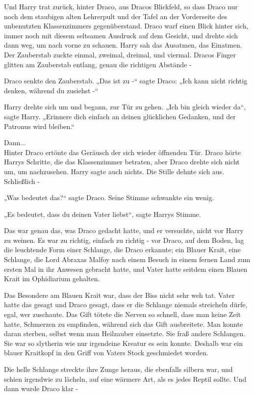 {Und Harry trat zurück, hinter Draco, aus Dracos Blickfeld, so dass Draco nur noch dem staubigen alten Lehrerpult und der Tafel an der Vorderseite des unbenutzten Klassenzimmers gegenüberstand. Draco warf einen Blick hinter sich, immer noch mit diesem seltsamen Ausdruck auf dem Gesicht, und drehte sich dann weg, um nach vorne zu schauen. Harry sah das Ausatmen, das Einatmen. Der Zauberstab zuckte einmal, zweimal, dreimal, und viermal. Dracos Finger glitten am Zauberstab entlang, genau die richtigen Abstände -

Draco senkte den Zauberstab. „Das ist zu -“ sagte Draco: „Ich kann nicht richtig denken, während du zusiehst -“

Harry drehte sich um und begann, zur Tür zu gehen. „Ich bin gleich wieder da“, sagte Harry. „Erinnere dich einfach an deinen glücklichen Gedanken, und der Patronus wird bleiben.“

Dann...\\ Hinter Draco ertönte das Geräusch der sich wieder öffnenden Tür. Draco hörte Harrys Schritte, die das Klassenzimmer betraten, aber Draco drehte sich nicht um, um nachzusehen. Harry sagte auch nichts. Die Stille dehnte sich aus. Schließlich -

„Was bedeutet das?“ sagte Draco. Seine Stimme schwankte ein wenig.

„Es bedeutet, dass du deinen Vater liebst“, sagte Harrys Stimme.

Das war genau das, was Draco gedacht hatte, und er versuchte, nicht vor Harry zu weinen. Es war zu richtig, einfach zu richtig - vor Draco, auf dem Boden, lag die leuchtende Form einer Schlange, die Draco erkannte; ein Blauer Krait, eine Schlange, die Lord Abraxas Malfoy nach einem Besuch in einem fernen Land zum ersten Mal in ihr Anwesen gebracht hatte, und Vater hatte seitdem einen Blauen Krait im Ophidiarium gehalten.

Das Besondere am Blauen Krait war, dass der Biss nicht sehr weh tat. Vater hatte das gesagt und Draco gesagt, dass er die Schlange niemals streicheln dürfe, egal, wer zuschaute. Das Gift tötete die Nerven so schnell, dass man keine Zeit hatte, Schmerzen zu empfinden, während sich das Gift ausbreitete. Man konnte daran sterben, selbst wenn man Heilzauber einsetzte. Sie fraß andere Schlangen. Sie war so slytherin wie nur irgendeine Kreatur es sein konnte. Deshalb war ein blauer Kraitkopf in den Griff von Vaters Stock geschmiedet worden.

Die helle Schlange streckte ihre Zunge heraus, die ebenfalls silbern war, und schien irgendwie zu lächeln, auf eine wärmere Art, als es jedes Reptil sollte. Und dann wurde Draco klar -

}
